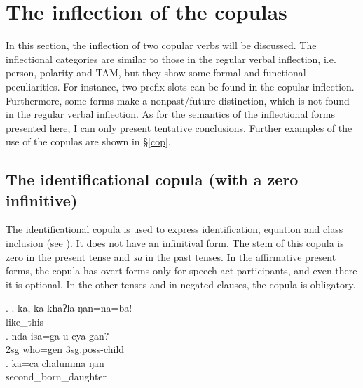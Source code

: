 \section{The inflection of the copulas}\label{cop-infl}
 
In this section, the inflection of two copular verbs will be discussed. The inflectional categories are similar to those in the regular verbal inflection, i.e. person, polarity and TAM, but they show some formal and functional peculiarities. For instance, two prefix slots can be found in the copular inflection. Furthermore, some forms make a nonpast/future distinction, which is not found in the regular verbal inflection. As for the semantics of the inflectional forms presented here, I can only present tentative conclusions. Further examples of the use of the copulas are shown in §\ref{cop}. 

\subsection{The identificational copula (with a zero infinitive)}

The identificational copula is used to express identification, equation and class inclusion (see \Next). It does not have an infinitival form. The stem of this copula is zero in the present tense and \emph{sa} in the past tenses. In the affirmative present forms, the copula has overt forms only for speech-act participants, and even there it is optional. In the other tenses and in negated clauses, the copula is obligatory. 


\ex. \ag. ka, ka khaʔla    ŋan=na=ba!      \\
    like\_this \\
\bg. nda isa=ga u-cya gan?\\
{\sc 2sg} who{\sc =gen} {\sc 3sg.poss}-child  \\
\bg. ka=ca chalumma ŋan\\
 second\_born\_daughter  \\


